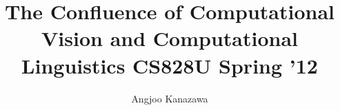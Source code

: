 \newcommand{\sig}{\sigma}
\newcommand{\eps}{\epsilon}
\newcommand{\del}{\delta}
\newcommand{\ah}{\alpha}
\newcommand{\lam}{\lambda}
\newcommand{\gam}{\gamma}
\newcommand{\kap}{\kappa}
\newcommand{\rarr}{\rightarrow}
\newcommand{\larr}{\leftarrow}
\newcommand{\ol}{\overline}
\newcommand{\mbb}{\mathbb}
\newcommand{\contra}{\Rightarrow\Leftarrow}
\newcommand{\lc}{\langle} %
\newcommand{\rc}{\rangle} %

\newcommand{\ben}{\begin{enumerate}}
\newcommand{\een}{\end{enumerate}}
\newcommand{\beq}{\begin{quote}}
\newcommand{\enq}{\end{quote}}
\newcommand{\hsone}{\hspace*{1cm}}
\newcommand{\hstwo}{\hspace*{2cm}}

\newcommand{\noi}{\noindent}
\parskip 5pt
\parindent 0pt

\documentclass[a4paper]{article}
\usepackage{amsmath,amssymb,algorithmic}

\title{The Confluence of Computational Vision and Computational Linguistics  CS828U Spring '12}
\author{Angjoo Kanazawa}
\maketitle

\section{January 30th Class 1}

\paragraph{Perception vs Language}

Perception is to understand the world through signals. Understanding
is recursive, because you only understand in respect to something
else. When does it stop? 

Perception is a set of algorithms that are operating on a system. What
do they do? The experts can't agree.

David Marr said the goal of perception is to assign labels to objects
in the data. Lead to the field of Computer Vision. This hasn't gone anywhere because there's no interaction with the world.

Difference bewteen perception and understanding: human can perceive
and relate the situation with a set of symbols in his head (the goat,
monkey, ed, tom and the mars bar).

